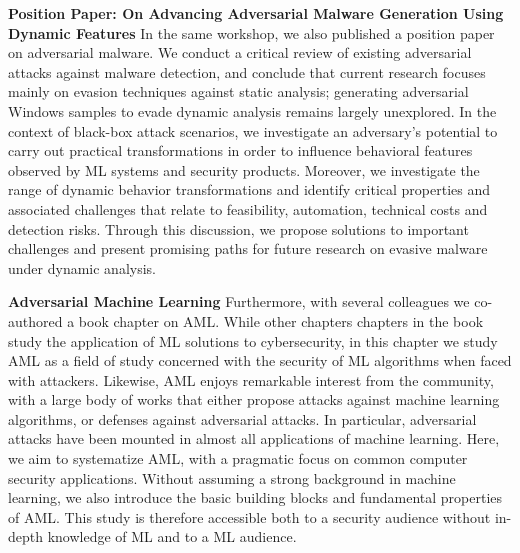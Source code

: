 \begin{myleftbar}
\end{myleftbar}

\textbf{Position Paper: On Advancing Adversarial Malware Generation Using Dynamic Features}
In the same workshop, we also published a position paper on adversarial malware.
We conduct a critical review of existing adversarial attacks against malware detection, and conclude that current research focuses mainly on evasion techniques against static analysis; generating adversarial Windows samples to evade dynamic analysis remains largely unexplored.
In the context of black-box attack scenarios, we investigate an adversary's potential to carry out practical transformations in order to influence behavioral features observed by ML systems and security products. Moreover, we investigate the range of dynamic behavior transformations and identify critical properties and associated challenges that relate to feasibility, automation, technical costs and detection risks.
Through this discussion, we propose solutions to important challenges and present promising paths for future research on evasive malware under dynamic analysis.

\begin{myleftbar}
\end{myleftbar}

\textbf{Adversarial Machine Learning}
Furthermore, with several colleagues we co-authored a book chapter on \gls{AML}.
While other chapters chapters in the book study the application of ML solutions to cybersecurity, in this chapter we study \gls{AML} as a field of study concerned with the security of ML algorithms when faced with attackers.
Likewise, \gls{AML} enjoys remarkable interest from the community, with a large body of works that either propose attacks against machine learning algorithms, or defenses against adversarial attacks.
In particular, adversarial attacks have been mounted in almost all applications of machine learning.
Here, we aim to systematize \gls{AML}, with a pragmatic focus on common computer security applications. Without assuming a strong background in machine learning, we also introduce the basic building blocks and fundamental properties of \gls{AML}.
This study is therefore accessible both to a security audience without in-depth knowledge of ML and to a ML audience.

\begin{myleftbar}
\end{myleftbar}

